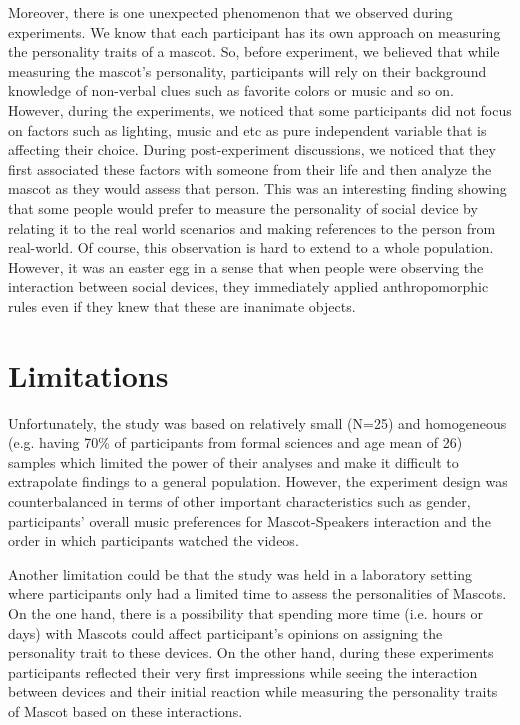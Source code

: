 \par Moreover, there is one unexpected phenomenon that we observed during experiments.
We know that each participant has its own approach on measuring the personality traits of a mascot.
So, before experiment, we believed that while measuring the mascot’s personality,
participants will rely on their background knowledge of non-verbal clues such as favorite colors or music and so on.
However, during the experiments, we noticed that some participants did not focus on
factors such as lighting, music and etc as pure independent variable that is affecting their choice.
During post-experiment discussions, we noticed that they first associated these factors with
someone from their life and then analyze the mascot as they would assess that person.
This was an interesting finding showing that some people would prefer to measure the
personality of social device by relating it to the real world scenarios and making
references to the person from real-world.
Of course, this observation is hard to extend to a whole population.
However, it was an easter egg in a sense that when people were observing the
interaction between social devices, they immediately applied anthropomorphic rules
even if they knew that these are inanimate objects.

\section{Limitations}
\label{sec:limitations}
Unfortunately, the study was based on relatively small (N=25) and homogeneous
(e.g. having 70\% of participants from formal sciences and age mean of 26) samples which
limited the power of their analyses and make it difficult to extrapolate findings to a general population.
However, the experiment design was counterbalanced in terms of other important
characteristics such as gender, participants’ overall music preferences for Mascot-Speakers
interaction and the order in which participants watched the videos.

\par Another limitation could be that the study was held in a laboratory setting where
participants only had a limited time to assess the personalities of Mascots.
On the one hand, there is a possibility that spending more time (i.e. hours or days)
with Mascots could affect participant’s opinions on assigning the personality trait to these devices.
On the other hand, during these experiments participants reflected their very first impressions
while seeing the interaction between devices and their initial reaction while measuring the
personality traits of Mascot based on these interactions.

